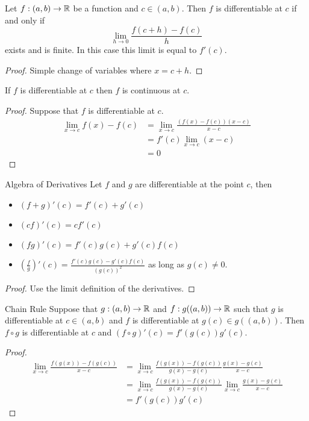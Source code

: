 \documentclass[a4paper]{article}
\begin{document}
\begin{prp}{}{} Let $f:(a,b)\to\mathbb{R}$ be a function and $c\in(a,b)$. Then $f$ is differentiable at $c$ if and only if $$\lim_{h\to 0}\frac{f(c+h)-f(c)}{h}$$ exists and is finite. In this case this limit is equal to $f'(c)$. \tcbline
\begin{proof}
Simple change of variables where $x=c+h$. 
\end{proof}
\end{prp}

\begin{prp}{}{} If $f$ is differentiable at $c$ then $f$ is continuous at $c$. \tcbline
\begin{proof} Suppose that $f$ is differentiable at $c$. 
\begin{align*}
\lim_{x\to c}f(x)-f(c)&=\lim_{x\to c}\frac{(f(x)-f(c))(x-c)}{x-c}\\
&=f'(c)\lim_{x\to c}(x-c)\\
&=0
\end{align*}
\end{proof}
\end{prp}

\begin{thm}{Algebra of Derivatives}{} Let $f$ and $g$ are differentiable at the point $c$, then
\begin{itemize}
\item $(f+g)'(c)=f'(c)+g'(c)$
\item $(cf)'(c)=cf'(c)$
\item $(fg)'(c)=f'(c)g(c)+g'(c)f(c)$
\item $\left(\frac{f}{g}\right)'(c)=\frac{f'(c)g(c)-g'(c)f(c)}{\left(g(c)\right)^2}$ as long as $g(c)\neq 0$. 
\end{itemize}\tcbline
\begin{proof} Use the limit definition of the derivatives. 
\end{proof}
\end{thm}

\begin{thm}{Chain Rule}{} Suppose that $g:(a,b)\to\mathbb{R}$ and $f:g((a,b))\to\mathbb{R}$ such that $g$ is differentiable at $c\in(a,b)$ and $f$ is differentiable at $g(c)\in g((a,b))$. Then $f\circ g$ is differentiable at $c$ and $(f\circ g)'(c)=f'(g(c))g'(c)$. \tcbline
\begin{proof}
\begin{align*}
\lim_{x\to c}\frac{f(g(x))-f(g(c))}{x-c}&=\lim_{x\to c}\frac{f(g(x))-f(g(c))}{g(x)-g(c)}\frac{g(x)-g(c)}{x-c}\\
&=\lim_{x\to c}\frac{f(g(x))-f(g(c))}{g(x)-g(c)}\lim_{x\to c}\frac{g(x)-g(c)}{x-c}\\
&=f'(g(c))g'(c)
\end{align*}
\end{proof}
\end{thm}
\end{document}
